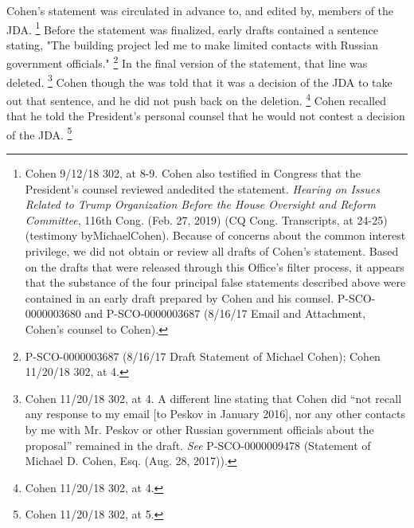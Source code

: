 {Cohen's statement was circulated in advance to, and edited by, members of the JDA.%
\footnote{Cohen 9/12/18 302, at 8-9.
Cohen also testified in Congress that the President’s counsel reviewed andedited the statement.
\textit{Hearing on Issues Related to Trump Organization Before the House Oversight and Reform Committee}, 116th Cong. (Feb. 27, 2019) (CQ Cong. Transcripts, at 24-25) (testimony byMichaelCohen).
Because of concerns about the common interest privilege, we did not obtain or review all drafts of Cohen’s statement.
Based on the drafts that were released through this Office’s filter process, it appears that the substance of the four principal false statements described above were contained in an early draft prepared by Cohen and his counsel.
P-SCO-0000003680 and P-SCO-0000003687 (8/16/17 Email and Attachment, Cohen’s counsel to Cohen).}
Before the statement was finalized, early drafts contained a sentence stating, "The building project led me to make limited contacts with Russian government officials."%
\footnote{P-SCO-0000003687 (8/16/17 Draft Statement of Michael Cohen);
Cohen 11/20/18 302, at 4.}
In the final version of the statement, that line was deleted.%
\footnote{Cohen 11/20/18 302, at 4.
A different line stating that Cohen did “not recall any response to my email [to Peskov in January 2016], nor any other contacts by me with Mr. Peskov or other Russian government officials about the proposal” remained in the draft.
\textit{See} P-SCO-0000009478 (Statement of Michael D. Cohen, Esq. (Aug. 28, 2017)).}
Cohen though the was told that it was a decision of the JDA to take out that sentence, and he did not push back on the deletion.%
\footnote{Cohen 11/20/18 302, at 4.}
Cohen recalled that he told the President's personal counsel that he would not contest a decision of the JDA.%
\footnote{Cohen 11/20/18 302, at 5.}

}

